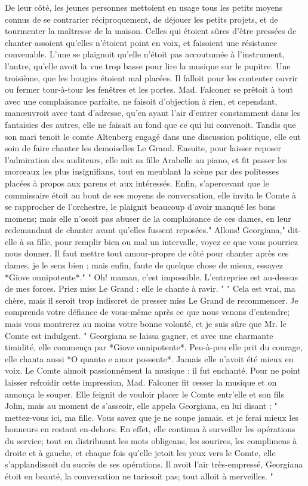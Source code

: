 De leur côté, les jeunes personnes mettoient en usage tous les petits moyens connus de se contrarier réciproquement, de déjouer les petits projets, et de tourmenter la maîtresse de la maison. Celles qui étoient sûres d'être pressées de chanter assoient qu'elles n'étoient point en voix, et faisoient une résistance convenable. L'une se plaignoit qu'elle n'étoit pas accoutumée à l'instrument, l'autre,\setcounter{page}{117} qu'elle avoit la vue trop basse pour lire la musique sur le pupitre. Une troisième, que les bougies étoient mal placées. Il falloit pour les contenter ouvrir ou fermer tour-à-tour les fenêtres et les portes. Mad. Falconer se prêtoit à tout avec une complaisance parfaite, ne faisoit d'objection à rien, et cependant, manœuvroit avec tant d'adresse, qu'en ayant l'air d'entrer constamment dans les fantaisies des autres, elle ne faisait au fond que ce qui lui convenoit. Tandis que son mari tenoit le comte Altenberg engagé dans une discussion politique, elle eut soin de faire chanter les demoiselles Le Grand. Ensuite, pour laisser reposer l'admiration des auditeurs, elle mit sa fille Arabelle au piano, et fit passer les morceaux les plus insignifians, tout en meublant la scène par des politesses placées à propos aux parens et aux intéressés. Enfin, s'apercevant que le commissaire étoit au bout de ses moyens de conversation, elle invita le Comte à se rapprocher de l'orchestre, le plaignit beaucoup d'avoir manqué les bons momens; mais elle n'osoit pas abuser de la complaisance de ces dames, en leur redemandant de chanter avant qu'elles fussent reposées." Allons! Georgiana," dit-elle à sa fille, pour remplir bien ou mal\setcounter{page}{118} un intervalle, voyez ce que vous pourriez nous donner. Il faut mettre tout amour-propre de côté pour chanter après ces dames, je le sens bien ; mais enfin, faute de quelque chose de mieux, essayez *Giove onnipotente*."
" Oh! maman, c'est impossible. L'entreprise est au-dessus de mes forces. Priez miss Le Grand : elle le chante à ravir. "
" Cela est vrai, ma chère, mais il seroit trop indiscret de presser miss Le Grand de recommencer. Je comprends votre défiance de vous-même après ce que nous venons d'entendre; mais vous montrerez au moins votre bonne volonté, et je suis sûre que Mr. le Comte est indulgent. "
Georgiana se laissa gagner, et avec une charmante timidité, elle commença par *Giove onnipotente*. Peu-à-peu elle prit du courage, elle chanta aussi *O quanto e amor possente*. Jamais elle n'avoit été mieux en voix. Le Comte aimoit passionnément la musique : il fut enchanté. Pour ne point laisser refroidir cette impression, Mad. Falconer fit cesser la musique et on annonça le souper. Elle feignit de vouloir placer le Comte entr'elle et son fils John, mais au moment de s'asseoir, elle appela Georgiana, en lui disant : " mettez-vous\setcounter{page}{119} ici, ma fille. Vous savez que je ne soupe jamais, et je ferai mieux les honneurs en restant en-dehors. En effet, elle continua à surveiller les opérations du service; tout en distribuant les mots obligeans, les sourires, les complimens à droite et à gauche, et chaque fois qu'elle jetoit les yeux vers le Comte, elle s'applandissoit du succès de ses opérations. Il avoit l'air très-empressé, Georgiana étoit en beauté, la conversation ne tarissoit pas; tout alloit à merveilles. "
